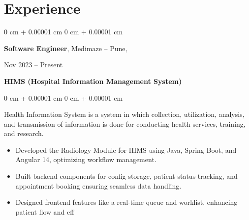 \documentclass[10pt, letterpaper]{article}
\newenvironment{highlights}{
    \begin{itemize}[
        topsep=0.10 cm,
        parsep=0.10 cm,
        partopsep=0pt,
        itemsep=0pt,
        leftmargin=0 cm + 10pt
    ]
}{
    \end{itemize}
} %
\newenvironment{onecolentry}{
    \begin{adjustwidth}{
        0 cm + 0.00001 cm
    }{
        0 cm + 0.00001 cm
    }
}{
    \end{adjustwidth}
} %
\newenvironment{twocolentry}[2][]{
    \onecolentry
    \def\secondColumn{#2}
    \setcolumnwidth{\fill, 4.5 cm}
    \begin{paracol}{2}
}{
    \switchcolumn \raggedleft \secondColumn
    \end{paracol}
    \endonecolentry
} %
\begin{document}


    \section{Experience}

        
        \begin{twocolentry}{
            Nov 2023 – Present
        }
            \textbf{Software Engineer}, Medimaze -- Pune,
            \end{twocolentry}
            \textbf{HIMS (Hospital Information Management System)}
            \vspace{0.10 cm}
    \begin{onecolentry}
        \text Health Information System is a system in which collection, utilization, analysis, and transmission of information is done for conducting health services, training, and research.
        \begin{highlights}
            \item Developed the Radiology Module for HIMS using Java, Spring Boot, and Angular 14, optimizing workflow management.  
            \item Built backend components for config storage, patient status tracking, and appointment booking ensuring seamless data handling.  
            \item Designed frontend features like a real-time queue and worklist, enhancing patient flow and eff
        \end{highlights}
    \end{onecolentry}
    \vspace{0.2 cm}
    
\end{document}
